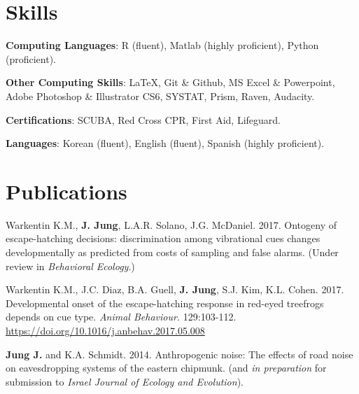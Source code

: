 \documentclass[margin,line]{res}
\begin{document}
\begin{resume}
\section{\sc Skills} 
{\bf Computing Languages}:  R (fluent), Matlab (highly proficient), Python (proficient).  
\vspace*{-3mm}

{\bf Other Computing Skills}: \LaTeX, Git \& Github, MS Excel \& Powerpoint, Adobe Photoshop \& Illustrator CS6, SYSTAT, Prism, Raven, Audacity. 
\vspace*{-3mm}

{\bf Certifications}: SCUBA, Red Cross CPR, First Aid, Lifeguard. 
\vspace*{-3mm}

{\bf Languages}: Korean (fluent), English (fluent), Spanish (highly proficient). 

% 

\section{\sc Publications}

Warkentin K.M., {\bf J. Jung}, L.A.R. Solano, J.G. McDaniel. 2017. {Ontogeny of escape-hatching decisions: discrimination among vibrational cues changes developmentally as predicted from costs of sampling and false alarms.} (Under review in {\it Behavioral Ecology}.) 

\vspace{-.3cm}
Warkentin K.M., J.C. Diaz, B.A. Guell, {\bf J. Jung}, S.J. Kim, K.L. Cohen. 2017. {Developmental onset of the escape-hatching response in red-eyed treefrogs depends on cue type.} {\it Animal Behaviour.} {129:103-112.} \href{http://www.sciencedirect.com/science/article/pii/S0003347217301458}{\ttfamily https://doi.org/10.1016/j.anbehav.2017.05.008}

\vspace{-.3cm}
{\bf Jung J.} and K.A. Schmidt. 2014. {Anthropogenic noise: The effects of road noise on eavesdropping systems of the eastern chipmunk.} \href{http://www.caryinstitute.org/sites/default/files/public/reprints/jung_2014_REU.pdf}{} (and {\it in preparation} for submission to {\it Israel Journal of Ecology and Evolution}).
  


\end{resume}
\end{document}
